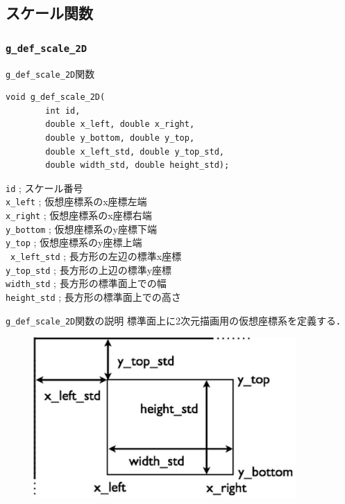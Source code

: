 \documentclass[platex,a4paper,12pt]{jsarticle}%
\begin{document}
\clearpage
\subsection{スケール関数}

\subsubsection{\texttt{g\_def\_scale\_2D}}

\begin{itembox}[l]{\texttt{g\_def\_scale\_2D}関数}
\begin{verbatim}
void g_def_scale_2D(
        int id,
        double x_left, double x_right,
        double y_bottom, double y_top,
        double x_left_std, double y_top_std,
        double width_std, double height_std);
\end{verbatim}
\verb|id| ; スケール番号\\
\verb|x_left| ; 仮想座標系のx座標左端\\
\verb|x_right| ; 仮想座標系のx座標右端\\
\verb|y_bottom| ; 仮想座標系のy座標下端\\
\verb|y_top| ; 仮想座標系のy座標上端\\\
\verb|x_left_std| ; 長方形の左辺の標準x座標\\
\verb|y_top_std| ; 長方形の上辺の標準y座標\\
\verb|width_std| ; 長方形の標準面上での幅\\
\verb|height_std| ; 長方形の標準面上での高さ
\end{itembox}

\begin{itembox}[l]{\texttt{g\_def\_scale\_2D}関数の説明}
標準面上に2次元描画用の仮想座標系を定義する．
\end{itembox}

\begin{figure}[htb]
\centering
\includegraphics[width=100mm]{./Figures/eps/Canvas_g_def_scale_2D.eps}
\end{figure}
\end{document}
